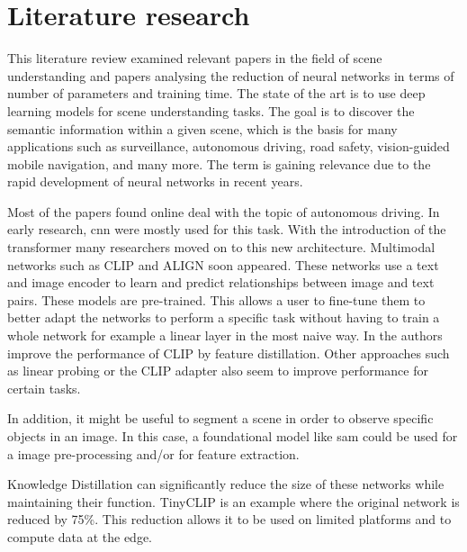\chapter{Literature research}
This literature review examined relevant papers in the field of scene understanding and papers analysing the reduction of neural networks in terms of number of parameters and training time.
The state of the art is to use deep learning models for scene understanding tasks.
The goal is to discover the semantic information within a given scene, which is the basis for many applications such as surveillance, autonomous driving, road safety, vision-guided mobile navigation, and many more.
The term is gaining relevance due to the rapid development of neural networks in recent years.

Most of the papers found online deal with the topic of autonomous driving\cite{sceneunderstandingautdriving1}.
In early research, \acrfull{cnn}\cite{SegNet} were mostly used for this task.
With the introduction of the transformer \cite{attentionisallyouneed} many researchers moved on to this new architecture.
Multimodal networks such as CLIP\cite{clip} and ALIGN\cite{ALIGN} soon appeared.
These networks use a text and image encoder to learn and predict relationships between image and text pairs.
These models are pre-trained.
This allows a user to fine-tune them to better adapt the networks to perform a specific task without having to train a whole network for example a linear layer in the most naive way.
In \cite{finetuneclip} the authors improve the performance of CLIP by feature distillation.
Other approaches such as linear probing\cite{linearprobeclip} or the CLIP adapter\cite{clipadapter} also seem to improve performance for certain tasks.

In addition, it might be useful to segment a scene in order to observe specific objects in an image.
In this case, a foundational model like \Acrfull{sam}\cite{sam} could be used for a image pre-processing and/or for feature extraction.

Knowledge Distillation can significantly reduce the size of these networks while maintaining their function.
TinyCLIP\cite{tinyclip} is an example where the original network is reduced by 75\%.
This reduction allows it to be used on limited platforms and to compute data at the edge.

